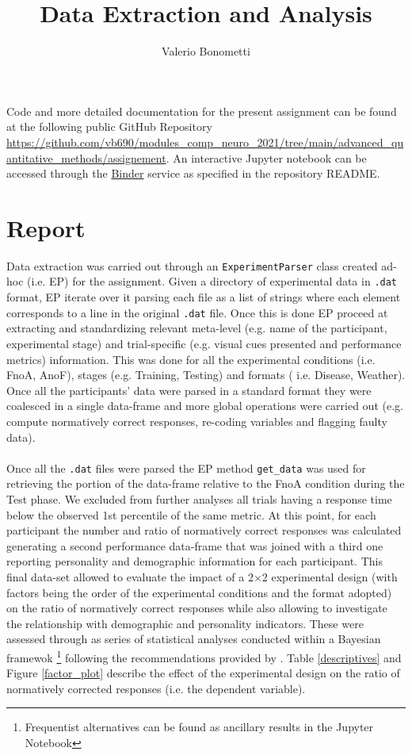 \documentclass{article}
\begin{document}
\title{Data Extraction and Analysis}
\author{Valerio Bonometti}

\maketitle


Code and more detailed documentation for the present assignment can be found at the following public GitHub Repository \url{https://github.com/vb690/modules_comp_neuro_2021/tree/main/advanced_quantitative_methods/assignement}. An interactive Jupyter notebook can be accessed through the \href{https://mybinder.readthedocs.io/en/latest/}{Binder} service as specified in the repository README. 

\section*{Report}
Data extraction was carried out through an \verb|ExperimentParser| class created ad-hoc (i.e. EP) for the assignment. Given a directory of experimental data in \verb|.dat| format, EP iterate over it parsing each file as a list of strings where each element corresponds to a line in the original \verb|.dat| file. Once this is done EP proceed at extracting and standardizing relevant meta-level (e.g. name of the participant, experimental stage) and trial-specific (e.g. visual cues presented and performance metrics) information. This was done for all the experimental conditions (i.e. FnoA, AnoF), stages (e.g. Training, Testing) and formats ( i.e. Disease, Weather). Once all the participants' data were parsed in a standard format they were coalesced in a single data-frame and more global operations were carried out (e.g. compute normatively correct responses, re-coding variables and flagging faulty data).\\
\\
Once all the \verb|.dat| files were parsed the EP method \verb|get_data| was used for retrieving the portion of the data-frame relative to the FnoA condition during the Test phase. We excluded from further analyses all trials having a response time below the observed 1st percentile of the same metric. At this point, for each participant the number and ratio of normatively correct responses was calculated generating a second performance data-frame that was joined with a third one reporting personality and demographic information for each participant. This final data-set allowed to evaluate the impact of a 2$\times$2 experimental design  (with factors being the order of the experimental conditions and the format adopted) on the ratio of normatively correct responses while also allowing to investigate the relationship with demographic and personality indicators. These were assessed through as series of statistical analyses conducted within a Bayesian framewok \footnote{Frequentist alternatives can be found as ancillary results in the Jupyter Notebook} following the recommendations provided by \cite{gelman1992inference,van2021bayesian}. Table \ref{descriptives} and Figure \ref{factor_plot} describe the effect of the experimental design on the ratio of normatively corrected responses (i.e. the dependent variable).
\end{document}
